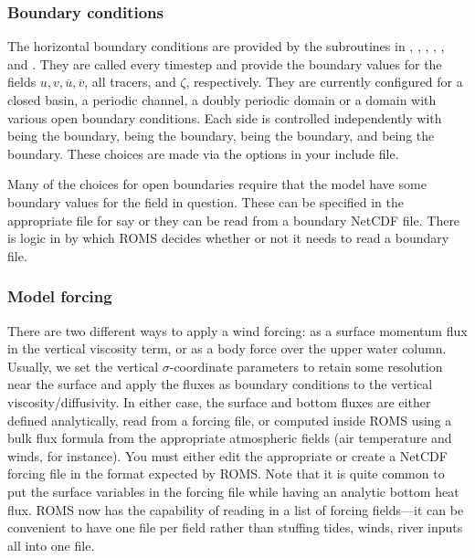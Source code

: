 \subsubsection{Boundary conditions}
\label{Bcs}
The horizontal boundary conditions are provided by the subroutines
in , , , ,
, and .  They are called every timestep
and provide the boundary values for the fields $u, v, \overline{u},
\overline{v}$, all tracers, and $\zeta$, respectively. They are currently
configured for a closed basin, a periodic channel, a doubly periodic
domain or a domain with various open boundary conditions. Each side is
controlled independently with  being the  boundary,
 being the  boundary,  being the 
boundary, and  being the  boundary. These choices are
made via the  options in your include file.

Many of the choices for open boundaries require that the model have
some boundary values for the field in question. These can be specified in
the appropriate  file for say  or
they can be read from a boundary NetCDF file. There is logic in
 by which ROMS decides whether or not it needs to
read a boundary file.

\subsubsection{Model forcing}
\label{Mforce}

There are two different ways to apply a wind forcing: as a surface
momentum flux in the vertical viscosity term, or as a body force over
the upper water column.
Usually, we set the vertical $\sigma$-coordinate
parameters to retain some resolution near the surface and apply the
fluxes as boundary conditions to the vertical viscosity/diffusivity.
In either case, the surface and bottom fluxes are either defined
analytically, read from a forcing file, or computed inside ROMS
using a bulk flux formula from the appropriate atmospheric fields
(air temperature and winds, for instance).  You must either edit the
appropriate  or create a NetCDF forcing
file in the format expected by ROMS. Note that it is quite common
to put the surface variables in the forcing file while having an analytic
bottom heat flux. ROMS now has the capability of reading in a list
of forcing fields---it can be convenient to have one file per field
rather than stuffing tides, winds, river inputs all into one file.

